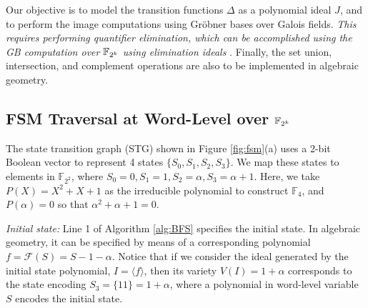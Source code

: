 
Our objective is to model the transition functions $\Delta$ as a
polynomial ideal $J$, and to perform the image computations 
using Gr\"obner bases over Galois fields. {\it
This requires performing quantifier elimination, which can be
accomplished using the GB computation over ${\mathbb{F}}_{2^k}$ using elimination
ideals} \cite{gao:qe-gf-gb}. Finally, the set union, intersection, and
complement operations are also to be implemented in algebraic geometry.

\subsection{FSM Traversal at Word-Level over ${\mathbb{F}}_{2^k}$} 
The state transition graph (STG) shown in Figure \ref{fig:fsm}(a) uses a
2-bit Boolean vector to represent 4 states $\{S_0, S_1, S_2,
S_3\}$. We map these states to elements in $\mathbb{F}_{2^2}$, where
$S_0 = 0, S_1 = 1, S_2 = \alpha, S_3 = \alpha+1$. Here, we take 
$P(X) = X^2+X+1$ as the irreducible polynomial to construct
$\mathbb{F}_4$, and $P(\alpha) = 0$ so that $\alpha^2 + \alpha + 1 =
0$.  

{\it Initial state:} Line 1 of Algorithm \ref{alg:BFS} specifies the initial state.
In algebraic geometry, it can be specified by means of a corresponding polynomial
 $f = \mathcal{F}(S) =
S - 1 - \alpha$. Notice that if we consider the ideal generated by the
initial state polynomial, $I = \langle f\rangle$, then its variety
$V(I) = 1+\alpha$ corresponds to the state encoding $S_3 = \{11\} =
1+\alpha$, where a polynomial in word-level variable $S$ encodes the
initial state. 



